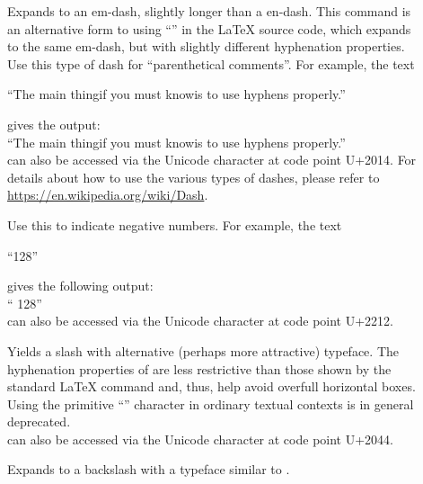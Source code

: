 \begin{description}
\item[\latexcmd{\textemdash}] \enforcenewline%
  Expands to an em-dash, slightly longer than a en-dash. This command is an
  alternative form to using \enquote{\cmdline{---}} in the \LaTeX{} source
  code, which expands to the same em-dash, but with slightly different
  hyphenation properties. Use this type of dash for ``parenthetical
  comments''. For example, the text%
  \begin{CommandLineListing}[print=true, xleftmargin=0pt, gobble=4]%
    ``The main thing\textemdash{}if you must know\textemdash{}is to use
    hyphens properly.''
  \end{CommandLineListing}
  gives the output: \\
  ``The main thing\textemdash{}if you must know\textemdash{}is to use hyphens properly.''\\
  \latexcmd{\textemdash} can also be accessed via the Unicode character at
  code point U+2014. For details about how to use the various types of
  dashes, please refer to \EG{} \url{https://en.wikipedia.org/wiki/Dash}.

\item[\latexcmd{\textminus}] \enforcenewline%
  Use this to indicate negative numbers. For example, the text
  \begin{CommandLineListing}[print=true, xleftmargin=0pt, gobble=4]%
    ``\textminus{}128''
  \end{CommandLineListing}
  gives the following output: \\
  `` \textminus{}128''\\
  \latexcmd{\textminus} can also be accessed via the Unicode character at
  code point U+2212.

\item[\latexcmd{\textfractionsolidus}] \enforcenewline%
  Yields a slash with alternative (perhaps more attractive) typeface. The
  hyphenation properties of \latexcmd{\textfractionsolidus} are less
  restrictive than those shown by the standard \LaTeX{} \latexcmd{\slash}
  command and, thus, help avoid overfull horizontal boxes. Using the
  primitive \enquote{\latexcmd{/}} character in ordinary textual contexts
  is in general deprecated. \\
  \latexcmd{\textfractionsolidus} can also be accessed via the Unicode
  character at code point U+2044.

\item[\latexcmd{\backtextfractionsolidus}] \enforcenewline%
  Expands to a backslash with a typeface similar to
  \latexcmd{\textfractionsolidus}.


\end{description}
